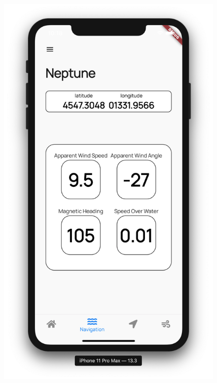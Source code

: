 \documentclass[12pt,italian,oneside]{report}
\begin{document}
\begin{firstheadlineitemize}
\begin{figure}[htp]
\begin{minipage}[c]{.5\columnwidth}
		\includegraphics[scale=0.31]{navigation_high_contrast}
	\end{minipage}\hspace*{\fill}
\end{figure}

\end{firstheadlineitemize}

\end{document}
